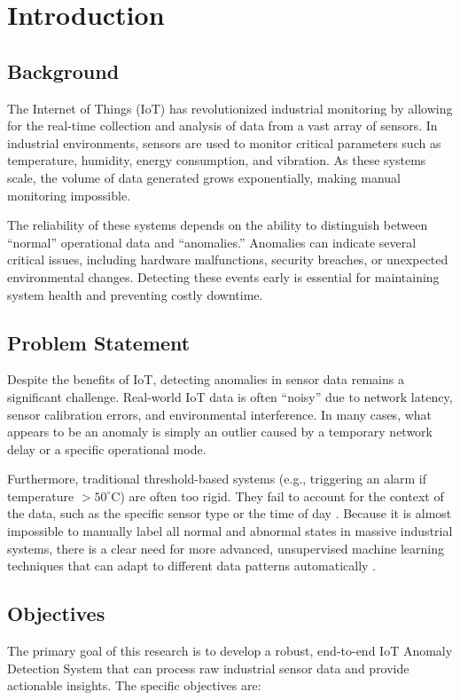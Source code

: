 \chapter{Introduction}

\section{Background}
The Internet of Things (IoT) has revolutionized industrial monitoring by allowing for the real-time collection and analysis of data from a vast array of sensors. In industrial environments, sensors are used to monitor critical parameters such as temperature, humidity, energy consumption, and vibration. As these systems scale, the volume of data generated grows exponentially, making manual monitoring impossible.

The reliability of these systems depends on the ability to distinguish between ``normal'' operational data and ``anomalies.'' Anomalies can indicate several critical issues, including hardware malfunctions, security breaches, or unexpected environmental changes. Detecting these events early is essential for maintaining system health and preventing costly downtime.

\section{Problem Statement}
Despite the benefits of IoT, detecting anomalies in sensor data remains a significant challenge. Real-world IoT data is often ``noisy'' due to network latency, sensor calibration errors, and environmental interference. In many cases, what appears to be an anomaly is simply an outlier caused by a temporary network delay or a specific operational mode.

Furthermore, traditional threshold-based systems (e.g., triggering an alarm if temperature $> 50^\circ$C) are often too rigid. They fail to account for the context of the data, such as the specific sensor type or the time of day \cite{zhang2022}. Because it is almost impossible to manually label all normal and abnormal states in massive industrial systems, there is a clear need for more advanced, unsupervised machine learning techniques that can adapt to different data patterns automatically \cite{kumar2021}.

\section{Objectives}
The primary goal of this research is to develop a robust, end-to-end IoT Anomaly Detection System that can process raw industrial sensor data and provide actionable insights. The specific objectives are:

